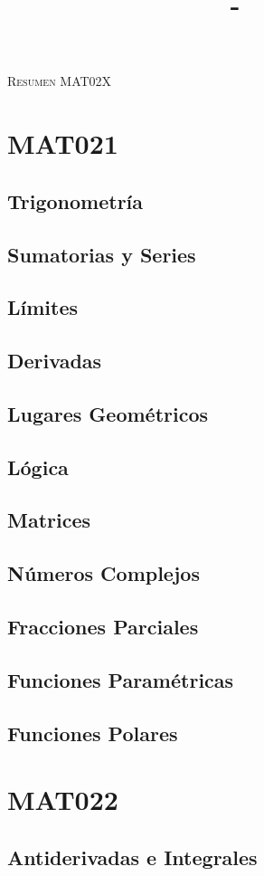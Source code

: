 \documentclass[letterpaper,12pt]{book}
\title{\Titulo - \Sigla \Ramo}
\author{\Name}
\begin{document}
\thispagestyle{empty}

\begin{center}
    \huge{\textsc{Resumen MAT02X}}
\end{center}

\tableofcontents

\chapter{MAT021}
    \section{Trigonometría}
        
    \section{Sumatorias y Series}
        
    \section{Límites}
        
    \section{Derivadas}
        
    \section{Lugares Geométricos}
        
    \section{Lógica}
        
    \section{Matrices}
        
    \section{Números Complejos}
        
    \section{Fracciones Parciales}
        
    \section{Funciones Paramétricas}
        
    \section{Funciones Polares}
        
        
\chapter{MAT022}
    \section{Antiderivadas e Integrales}
\vspace{1em}
\end{document}
